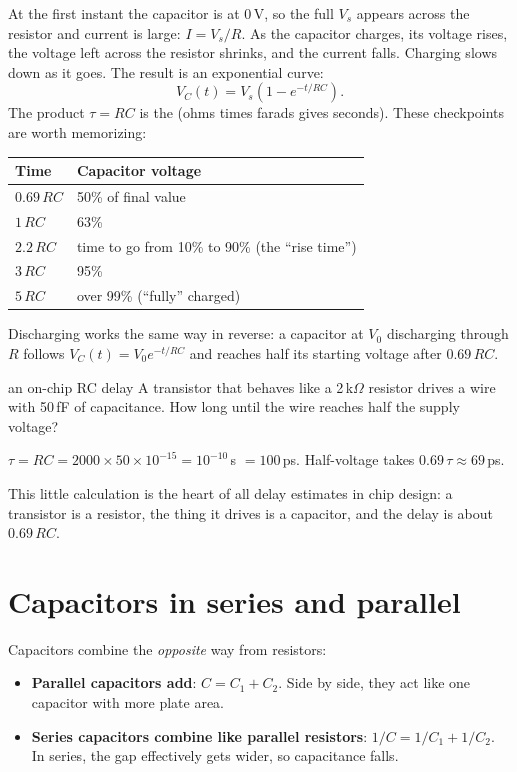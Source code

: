 At the first instant the capacitor is at 0\,V, so the full $V_s$ appears across the resistor and current is large: $I = V_s/R$. As the capacitor charges, its voltage rises, the voltage left across the resistor shrinks, and the current falls. Charging slows down as it goes. The result is an exponential curve:
\[
  V_C(t) = V_s\left(1 - e^{-t/RC}\right).
\]
The product $\tau = RC$ is the  (ohms times farads gives seconds). These checkpoints are worth memorizing:

\begin{center}
\begin{tabular}{ll}
\toprule
Time & Capacitor voltage \\
\midrule
$0.69\,RC$ & 50\% of final value \\
$1\,RC$ & 63\% \\
$2.2\,RC$ & time to go from 10\% to 90\% (the ``rise time'') \\
$3\,RC$ & 95\% \\
$5\,RC$ & over 99\% (``fully'' charged) \\
\bottomrule
\end{tabular}
\end{center}

Discharging works the same way in reverse: a capacitor at $V_0$ discharging through $R$ follows $V_C(t) = V_0 e^{-t/RC}$ and reaches half its starting voltage after $0.69\,RC$.

\begin{worked}{an on-chip RC delay}
A transistor that behaves like a 2\,k$\Omega$ resistor drives a wire with 50\,fF of capacitance. How long until the wire reaches half the supply voltage?

$\tau = RC = 2000 \times 50\times10^{-15} = 10^{-10}$\,s $= 100$\,ps. Half-voltage takes $0.69\,\tau \approx 69$\,ps.
\end{worked}

This little calculation is the heart of all delay estimates in chip design: a transistor is a resistor, the thing it drives is a capacitor, and the delay is about $0.69\,RC$.

\section{Capacitors in series and parallel}

Capacitors combine the \emph{opposite} way from resistors:
\begin{itemize}
  \item \textbf{Parallel capacitors add}: $C = C_1 + C_2$. Side by side, they act like one capacitor with more plate area.
  \item \textbf{Series capacitors combine like parallel resistors}: $1/C = 1/C_1 + 1/C_2$. In series, the gap effectively gets wider, so capacitance falls.
\end{itemize}

